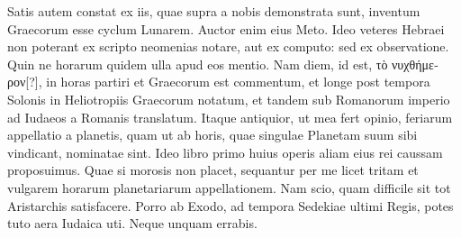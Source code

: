 Satis autem constat ex iis, quae supra a nobis demonstrata sunt,
 inventum
Graecorum esse cyclum Lunarem.
Auctor enim eius Meto.
Ideo veteres Hebraei non poterant ex scripto neomenias notare, aut
ex computo: sed ex observatione.
Quin ne horarum quidem ulla apud
eos mentio.
Nam diem, id est, \textgreek{τὸ νυχθήμερον[?]},
 in  horas partiri
et Graecorum est commentum, et longe post tempora Solonis in Heliotropiis
Graecorum notatum, et tandem sub Romanorum imperio
ad Iudaeos a Romanis translatum.
Itaque antiquior, ut mea fert opinio,
feriarum appellatio a planetis, quam ut ab horis, quae singulae
Planetam suum sibi vindicant, nominatae sint.
Ideo libro primo huius
operis aliam eius rei caussam proposuimus.
Quae si morosis non
placet, sequantur per me licet tritam et vulgarem horarum planetariarum
appellationem.
Nam scio, quam difficile sit tot Aristarchis satisfacere.
Porro ab Exodo, ad tempora Sedekiae ultimi Regis, potes
tuto aera Iudaica uti.
Neque unquam errabis.
%
